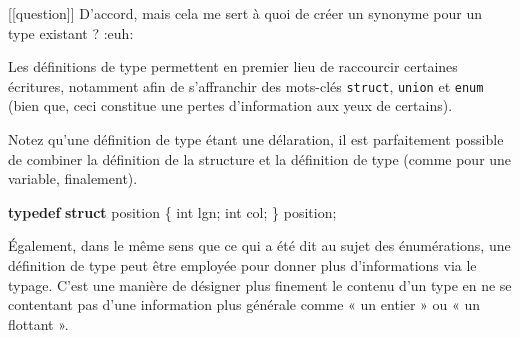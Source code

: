 \documentclass[]{article}
\newenvironment{Shaded}{}{}
\newcommand{\KeywordTok}[1]{\textcolor[rgb]{0.00,0.44,0.13}{\textbf{{#1}}}}
\newcommand{\DataTypeTok}[1]{\textcolor[rgb]{0.56,0.13,0.00}{{#1}}}
\newcommand{\DecValTok}[1]{\textcolor[rgb]{0.25,0.63,0.44}{{#1}}}
\newcommand{\SpecialCharTok}[1]{\textcolor[rgb]{0.25,0.44,0.63}{{#1}}}
\newcommand{\StringTok}[1]{\textcolor[rgb]{0.25,0.44,0.63}{{#1}}}
\newcommand{\ImportTok}[1]{{#1}}
\newcommand{\ControlFlowTok}[1]{\textcolor[rgb]{0.00,0.44,0.13}{\textbf{{#1}}}}
\newcommand{\PreprocessorTok}[1]{\textcolor[rgb]{0.74,0.48,0.00}{{#1}}}
\newcommand{\NormalTok}[1]{{#1}}
\begin{document}
{[}{[}question{]}{]} \textbar{} D'accord, mais cela me sert à quoi de
créer un synonyme pour un type existant ? :euh:

Les définitions de type permettent en premier lieu de raccourcir
certaines écritures, notamment afin de s'affranchir des mots-clés
\texttt{struct}, \texttt{union} et \texttt{enum} (bien que, ceci
constitue une pertes d'information aux yeux de certains).

\begin{Shaded}
\end{Shaded}

Notez qu'une définition de type étant une délaration, il est
parfaitement possible de combiner la définition de la structure et la
définition de type (comme pour une variable, finalement).

\begin{Shaded}
\begin{Highlighting}[]
\KeywordTok{typedef} \KeywordTok{struct} \NormalTok{position}
\NormalTok{\{}
    \DataTypeTok{int} \NormalTok{lgn;}
    \DataTypeTok{int} \NormalTok{col;}
\NormalTok{\} position;}
\end{Highlighting}
\end{Shaded}

Également, dans le même sens que ce qui a été dit au sujet des
énumérations, une définition de type peut être employée pour donner plus
d'informations via le typage. C'est une manière de désigner plus
finement le contenu d'un type en ne se contentant pas d'une information
plus générale comme « un entier » ou « un flottant ».
\end{document}
